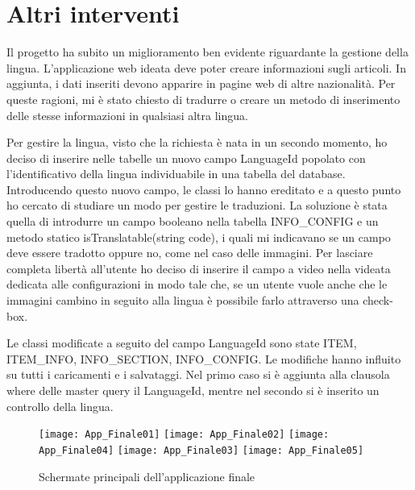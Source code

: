  
\section{Altri interventi}\label{altriInterveti}
Il progetto ha subito un miglioramento ben evidente riguardante la gestione della lingua. L'applicazione web ideata deve poter creare informazioni sugli articoli. In aggiunta, i dati inseriti devono apparire in pagine web di altre nazionalità. Per queste ragioni, mi è stato chiesto di tradurre o creare un metodo di inserimento delle stesse informazioni in qualsiasi altra lingua.

Per gestire la lingua, visto che la richiesta è nata in un secondo momento, ho deciso di inserire nelle tabelle un nuovo campo LanguageId popolato con l'identificativo della lingua individuabile in una tabella del database.
Introducendo questo nuovo campo, le classi lo hanno ereditato e a questo punto ho cercato di studiare un modo per gestire le traduzioni. La soluzione è stata quella di introdurre un campo booleano nella tabella INFO\_CONFIG e un metodo statico isTranslatable(string code), i quali mi indicavano se un campo deve essere tradotto oppure no, come nel caso delle immagini.
Per lasciare completa libertà all'utente ho deciso di inserire il campo a video nella videata dedicata alle configurazioni in modo tale che, se un utente vuole anche che le immagini cambino in seguito alla lingua è possibile farlo attraverso una check-box.

Le classi modificate a seguito del campo LanguageId sono state ITEM, ITEM\_INFO, INFO\_SECTION, INFO\_CONFIG. Le modifiche hanno influito su tutti i caricamenti e i salvataggi. Nel primo caso si è aggiunta alla clausola where delle master query il LanguageId, mentre nel secondo si è inserito un controllo della lingua.

\begin{figure}[!h] 
	\centering 
	\texttt{[image: App\_Finale01]}
	\texttt{[image: App\_Finale02]}
	\texttt{[image: App\_Finale04]}
	\texttt{[image: App\_Finale03]} 
	\texttt{[image: App\_Finale05]} 
	\caption{Schermate principali dell'applicazione finale}
	\label{App_finale}
\end{figure}

\newpage
